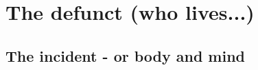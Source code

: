 \begin{comment}
\documentclass{book}
\usepackage{master}
\usepackage{changepage}
\newcommand{\rec}{$\text{R\'ecoltes et Semailles}$}
\newcommand{\no}{n$^\circ$}
\hfuzz = 100pt

\usepackage{titlesec}
\usepackage[dotinlabels]{titletoc}

\titleclass{\nnote}{straight}[\section]
\newcounter{nnote}
\renewcommand{\thennote}{\thesection.\arabic{nnote}}
\titlespacing*{\nnote}{0pt}{3.5ex plus 1ex minus .2ex}{1ex plus .2ex}
\titleformat{\nnote}[runin]{\bfseries }{\bfseries Note }{0pt}{}[]

\titleclass{\subnote}{straight}[\section]
\newcounter{subnote}
\renewcommand{\thesubnote}{\thesection.\arabic{subnote}}
\titlespacing*{\subnote}{0pt}{3.5ex plus 1ex minus .2ex}{1ex plus .2ex}
\titleformat{\subnote}[runin]{\bfseries }{\bfseries Note }{0pt}{}[]

\titlecontents{nnote}[9em]
{}{Note }{}{\titlerule*[1pc]{.}\contentspage}

\titlecontents{subnote}[11em]
{}{Note }{}{\titlerule*[1pc]{.}\contentspage}

\newtheorem{remark}{Remark}
\newtheorem*{remark*}{Remark}




\setcounter{chapter}{16}

\end{comment}

\chapter{The defunct (who lives...)}

\section{The incident - or body and mind}

